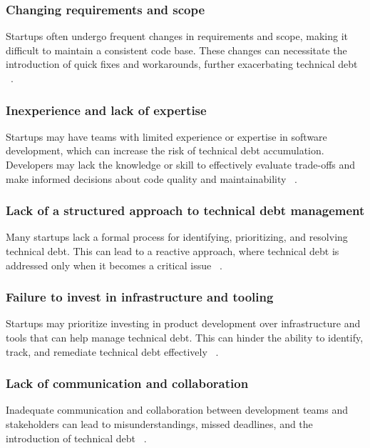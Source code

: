 \subsubsection{Changing requirements and scope}
Startups often undergo frequent changes in requirements and scope, making it difficult to maintain a consistent code base. These changes can necessitate the introduction of quick fixes and workarounds, further exacerbating technical debt ~\cite{DesignSt86:online,Creating18:online}.

\subsubsection{Inexperience and lack of expertise} 
Startups may have teams with limited experience or expertise in software development, which can increase the risk of technical debt accumulation. Developers may lack the knowledge or skill to effectively evaluate trade-offs and make informed decisions about code quality and maintainability ~\cite{Blog21:online}. 

\subsubsection{Lack of a structured approach to technical debt management} 
Many startups lack a formal process for identifying, prioritizing, and resolving technical debt. This can lead to a reactive approach, where technical debt is addressed only when it becomes a critical issue ~\cite{FowlerBottlenecks}.

\subsubsection{Failure to invest in infrastructure and tooling} 
Startups may prioritize investing in product development over infrastructure and tools that can help manage technical debt. This can hinder the ability to identify, track, and remediate technical debt effectively ~\cite{Blog21:online,Totalqua26:online}.

\subsubsection{Lack of communication and collaboration}
Inadequate communication and collaboration between development teams and stakeholders can lead to misunderstandings, missed deadlines, and the introduction of technical debt ~\cite{Whopayso60:online,TheTop5S17:online}.

